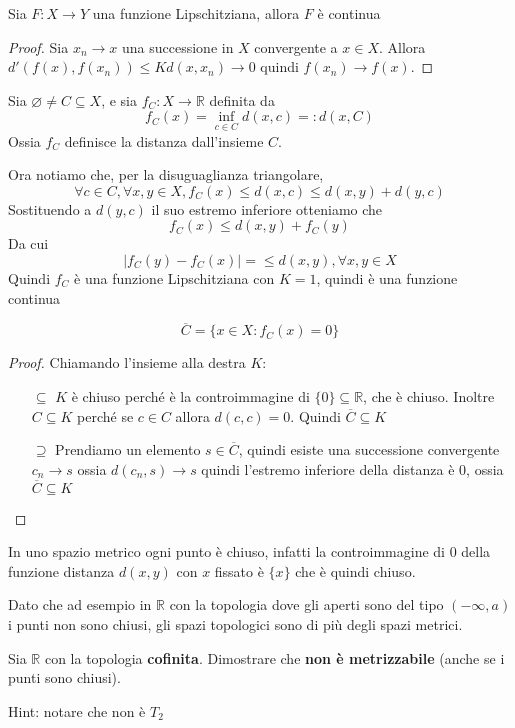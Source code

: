 \begin{proposition}
    Sia \(F : X \to Y\) una funzione Lipschitziana, allora \(F\) è continua
\end{proposition}
\begin{proof}
    Sia \(x_{n} \to x\) una successione in \(X\) convergente a \(x \in X\).
    Allora \(d'(f(x), f(x_{n})) \le Kd(x, x_{n}) \to 0\) quindi \(f(x_{n}) \to
    f(x)\).
\end{proof}

\begin{example}
    Sia \(\varnothing \neq C \subseteq  X\), e sia \(f_C : X \to \mathbb{R}\)
    definita da \[f_C(x) = \inf_{c \in C} d(x, c) =: d(x, C)\] 
    Ossia \(f_C\) definisce la distanza dall'insieme \(C\).

    Ora notiamo che, per la disuguaglianza triangolare,
    \[
        \forall c \in  C, \forall x, y \in X, f_C(x) \le d(x, c) \le d(x, y) +
        d(y, c)
    \]
    Sostituendo a \(d(y, c)\) il suo estremo inferiore otteniamo che
    \[
        f_C(x) \le d(x, y) + f_C(y)
    \]
    Da cui
    \[
        |f_C(y) - f_C(x)| = \le d(x, y), \forall x, y \in X
    \]
    Quindi \(f_C\) è una funzione Lipschitziana con \(K = 1\), quindi è una
    funzione continua
\end{example}

\begin{proposition}
    \[
        \overline{C} = \{x \in X : f_C(x) = 0\} 
    \]
\end{proposition}
\begin{proof}
    Chiamando l'insieme alla destra \(K\):
\begin{itemize}[label = --]
    \item[\(\subseteq  \) ] \(K\) è chiuso perché è la controimmagine di \(\{0\} \subseteq
        \mathbb{R}\), che è chiuso. Inoltre \(C \subseteq  K\) perché se \(c \in
        C\) allora \(d(c, c) = 0\). Quindi \(\overline{C} \subseteq  K\) 
    \item[\(\supseteq  \) ] Prendiamo un elemento \(s \in \overline{C}\), quindi esiste una
        successione convergente \(c_n \to  s\) ossia \(d(c_n, s) \to s\) quindi
        l'estremo inferiore della distanza è \(0\), ossia \(\overline{C}
        \subseteq  K\) 
\end{itemize}
\end{proof}

\begin{proposition}
    In uno spazio metrico ogni punto è chiuso, infatti la controimmagine di
    \(0\) della funzione distanza \(d(x, y)\) con \(x\) fissato è \(\{x\}\) che
    è quindi chiuso.

    Dato che ad esempio in \(\mathbb{R}\) con la topologia dove gli aperti sono del
    tipo \((-\infty, a)\) i punti non sono chiusi, gli spazi topologici sono di
    più degli spazi metrici.
\end{proposition}
\begin{example}
    Sia \(\mathbb{R}\) con la topologia \textbf{cofinita}. Dimostrare che
    \textbf{non è metrizzabile} (anche se i punti sono chiusi).

    Hint: notare che non è \(T_{2}\) 
\end{example}

